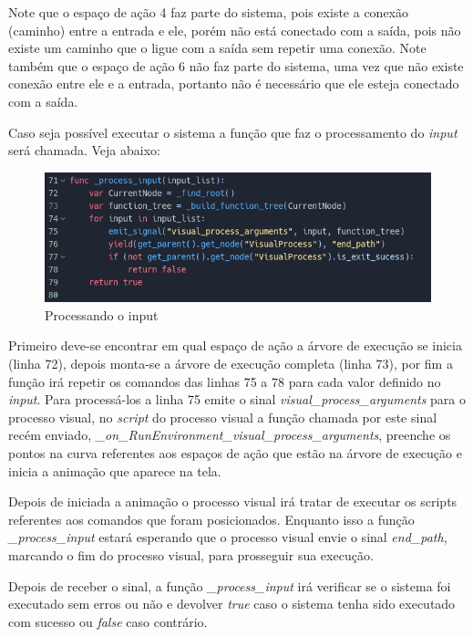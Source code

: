 Note que o espaço de ação 4 faz parte do sistema, pois existe a conexão 
(caminho) entre a entrada e ele, porém não está conectado com a saída, pois 
não existe um caminho que o ligue com a saída sem repetir uma conexão. Note
também que o espaço de ação 6 não faz parte do sistema, uma vez que não existe
conexão entre ele e a entrada, portanto não é necessário que ele esteja 
conectado com a saída.

Caso seja possível executar o sistema a função que faz o processamento do 
\textit{input} será chamada. Veja abaixo:

\begin{figure}[H]
    \includegraphics[width=\textwidth]{../figuras/process_input.png}
    \caption{Processando o input}
\end{figure}

Primeiro deve-se encontrar em qual espaço de ação a árvore de execução se 
inicia (linha 72), depois monta-se a árvore de execução completa (linha 73),
por fim a função irá repetir os comandos das linhas 75 a 78 para cada valor
definido no \textit{input}. Para processá-los a linha 75 emite o sinal 
\textit{visual\_process\_arguments} para o processo visual, no \textit{script} 
do processo visual a função chamada por este sinal recém enviado,
\textit{\_on\_RunEnvironment\_visual\_process\_arguments}, preenche os pontos na
curva referentes aos espaços de ação que estão na árvore de execução e inicia a
animação que aparece na tela.

Depois de iniciada a animação o processo visual irá tratar de executar os 
scripts referentes aos comandos que foram posicionados. Enquanto isso a função 
\textit{\_process\_input} estará esperando que o processo visual envie o sinal 
\textit{end\_path}, marcando o fim do processo visual, para prosseguir sua 
execução.

Depois de receber o sinal, a função \textit{\_process\_input} irá verificar se 
o sistema foi executado sem erros ou não e devolver \textit{true} caso o 
sistema tenha sido executado com sucesso ou \textit{false} caso contrário.

